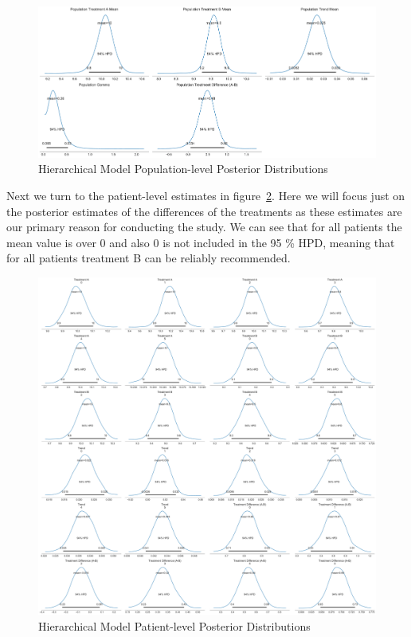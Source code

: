 \documentclass[12pt,a4paper,leqno]{report}
\theoremstyle{plain}
\theoremstyle{definition}
\theoremstyle{remark}
\begin{document}

\bigskip
\begin{figure}[H]
    \caption{Hierarchical Model Population-level Posterior Distributions}\label{hierarchicalmodelpopulationposteriors}
    \bigskip
    \includegraphics[width=\textwidth,height=\textheight,keepaspectratio]{hierarchical_model_population_level_posteriors.pdf}
\end{figure}
\bigskip

Next we turn to the patient-level estimates in figure\
\ref{hierarchicalmodelpatientposteriors}. Here we will focus just on the
posterior estimates of the differences of the treatments as these estimates are our
primary reason for conducting the study. We can see that for all patients
the mean value is over 0 and also 0 is not included in the 95 \% HPD, meaning that for
all patients treatment B can be reliably recommended.

\bigskip
\begin{figure}[H]
    \caption{Hierarchical Model Patient-level Posterior Distributions}\label{hierarchicalmodelpatientposteriors}
    \bigskip
    \includegraphics[width=\textwidth,height=\textheight,keepaspectratio]{hierarchical_model_patient_level_posteriors.pdf}
\end{figure}
\bigskip
\end{document}
